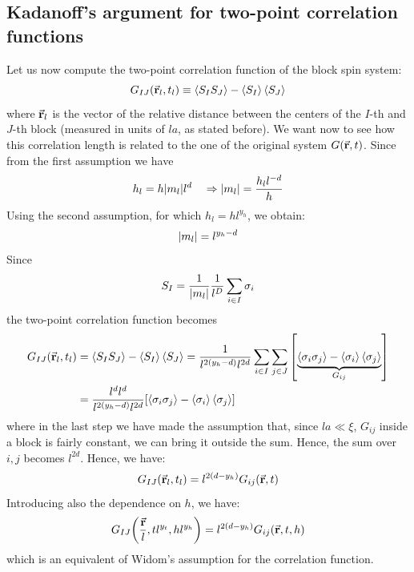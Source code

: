 \documentclass[../main/main.tex]{subfiles}
\begin{document}
\subsection{Kadanoff's argument for two-point correlation functions}
Let us now compute the two-point correlation function of the block spin system:
\begin{equation}
  G_{IJ} (\va{r}_l, t_l) \equiv \expval{S_I S_J} - \expval{S_I}\expval{S_J}
\end{equation}
where \( \va{r}_l \) is the vector of the relative distance between the centers of the \( I \)-th and \( J \)-th block (measured in units of \( la \), as stated before). We want now to see how this correlation length is related to the one of the original system \( G(\va{r},t) \).
Since from the first assumption we have
\begin{equation*}
  h_l = h \abs{m_l} l^d \quad \Rightarrow \abs{m_l} = \frac{h_l l^{-d}}{h}
\end{equation*}
Using the second assumption, for which \( h_l = h l^{y_h} \), we obtain:
\begin{equation*}
  \abs{m_l} = l^{y_h-d}
\end{equation*}
Since
\begin{equation*}
  S_I = \frac{1}{\abs{m_l} } \frac{1}{l^D} \sum_{i \in I}^{} \sigma _i
\end{equation*}
the two-point correlation function becomes
\begin{equation*}
\begin{split}
  G_{IJ} (\va{r}_l, t_l) &=  \expval{S_I S_J} - \expval{S_I} \expval{S_J}
   = \frac{1}{l^{2 (y_h - d)} l^{2d}} \sum_{i \in I}^{} \sum_{j \in J}^{} \qty[ \underbrace{\expval{\sigma _i \sigma _j} - \expval{\sigma _i} \expval{\sigma _j} }_{ G_{ij} }    ] \\
  & = \frac{l^d l^d}{l^{2(y_h-d)}l^{2d}} \qty[ \expval{\sigma _i \sigma _j} - \expval{\sigma _i} \expval{\sigma _j}  ]
\end{split}
\end{equation*}
where in the last step we have made the assumption that, since \( la \ll \xi  \), \( G_{ij} \) inside a block is fairly constant, we can bring it outside the sum. Hence, the sum over \( i,j \) becomes \( l^{2d} \).
Hence, we have:
\begin{equation}
  G_{IJ} (\va{r}_l, t_l) = l^{2(d-y_h)} G_{ij} (\va{r},t)
\end{equation}
Introducing also the dependence on \( h \), we have:
\begin{equation}
  G_{IJ} \qty(\frac{\va{r}}{l}, t l^{y_t}, h l^{y_h}) = l^{2 (d- y_h)} G_{ij} (\va{r},t,h)
 \end{equation}
which is an equivalent of Widom's assumption for the correlation function. 
\end{document}

